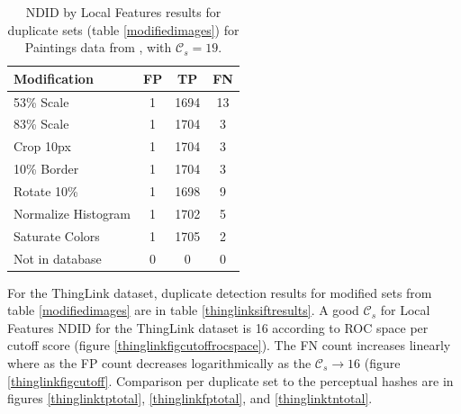 \documentclass[english,12pt,a4paper,pdftex,elec,utf8, table]{aaltothesis}
\begin{document}
\begin{table}
\caption{ NDID by Local Features results for duplicate sets (table \ref{modifiedimages}) for Paintings data from \cite{Vedaldi2012}, with $\mathcal{C}_s = 19$.}
\label{siftresults}
\begin{center}
  \begin{tabular}{@{}lccc@{}}
    \toprule
    Modification & FP & TP & FN\\
    \hline
    53\% Scale & 1 & 1694 & 13 \\
    83\% Scale & 1 & 1704 & 3 \\
    Crop 10px  & 1 & 1704 & 3 \\
    10\% Border & 1 & 1704 & 3 \\
    Rotate 10\% & 1 & 1698 & 9\\
    Normalize Histogram & 1 & 1702 & 5\\
    Saturate Colors & 1 & 1705 & 2\\
    Not in database & 0 & 0 & 0\\
    \bottomrule
\end{tabular}
\end{center}
\end{table}

\clearpage

For the ThingLink dataset, duplicate detection results for modified sets from table \ref{modifiedimages} are in table \ref{thinglinksiftresults}. A good $\mathcal{C}_s$ for Local Features NDID for the ThingLink dataset is 16 according to ROC space per cutoff score (figure \ref{thinglinkfigcutoffrocspace}). The FN count increases linearly where as the FP count decreases logarithmically as the $\mathcal{C}_s \rightarrow 16$ (figure \ref{thinglinkfigcutoff}. Comparison per duplicate set to the perceptual hashes are in figures \ref{thinglinktptotal}, \ref{thinglinkfptotal}, and \ref{thinglinktntotal}.
\end{document}
